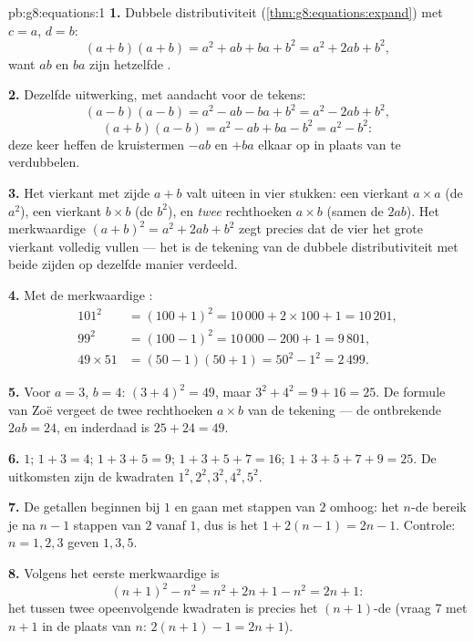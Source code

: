 \begin{solution}{pb:g8:equations:1}
\textbf{1.} Dubbele distributiviteit
(\cref{thm:g8:equations:expand}) met $c = a$, $d = b$:
\[
(a + b)(a + b) = a^2 + ab + ba + b^2 = a^2 + 2ab + b^2 ,
\]
want $ab$ en $ba$ zijn hetzelfde .

\textbf{2.} Dezelfde uitwerking, met aandacht voor de tekens:
\[
(a - b)(a - b) = a^2 - ab - ba + b^2 = a^2 - 2ab + b^2 ,
\]
\[
(a + b)(a - b) = a^2 - ab + ba - b^2 = a^2 - b^2 :
\]
deze keer heffen de kruistermen $-ab$ en $+ba$ elkaar op in plaats van te
verdubbelen.

\textbf{3.} Het vierkant met zijde $a + b$ valt uiteen in vier stukken: een
vierkant $a \times a$ (de $a^2$), een vierkant $b \times b$ (de $b^2$), en
\emph{twee} rechthoeken $a \times b$ (samen de $2ab$). Het merkwaardige 
$(a+b)^2 = a^2 + 2ab + b^2$ zegt precies dat de vier  het grote
vierkant volledig vullen --- het is de tekening van de dubbele distributiviteit
met beide zijden op dezelfde manier verdeeld.

\textbf{4.} Met de merkwaardige :
\begin{align*}
101^2 &= (100 + 1)^2 = 10\,000 + 2 \times 100 + 1 = 10\,201, \\
99^2 &= (100 - 1)^2 = 10\,000 - 200 + 1 = 9\,801, \\
49 \times 51 &= (50 - 1)(50 + 1) = 50^2 - 1^2 = 2\,499 .
\end{align*}

\textbf{5.} Voor $a = 3$, $b = 4$: $(3 + 4)^2 = 49$, maar
$3^2 + 4^2 = 9 + 16 = 25$. De formule van Zoë vergeet de twee rechthoeken
$a \times b$ van de tekening --- de ontbrekende $2ab = 24$, en inderdaad is
$25 + 24 = 49$.

\textbf{6.} $1$; $1 + 3 = 4$; $1 + 3 + 5 = 9$;
$1 + 3 + 5 + 7 = 16$; $1 + 3 + 5 + 7 + 9 = 25$. De uitkomsten zijn de kwadraten
$1^2, 2^2, 3^2, 4^2, 5^2$.

\textbf{7.} De  getallen beginnen bij $1$ en gaan met stappen van $2$
omhoog: het $n$-de bereik je na $n - 1$ stappen van $2$ vanaf $1$, dus is het
$1 + 2(n - 1) = 2n - 1$. Controle: $n = 1, 2, 3$ geven $1, 3, 5$.

\textbf{8.} Volgens het eerste merkwaardige  is
\[
(n + 1)^2 - n^2 = n^2 + 2n + 1 - n^2 = 2n + 1 :
\]
het  tussen twee opeenvolgende kwadraten is precies het $(n+1)$-de
 (vraag 7 met $n + 1$ in de plaats van $n$: $2(n+1) - 1 = 2n + 1$).


\end{solution}
